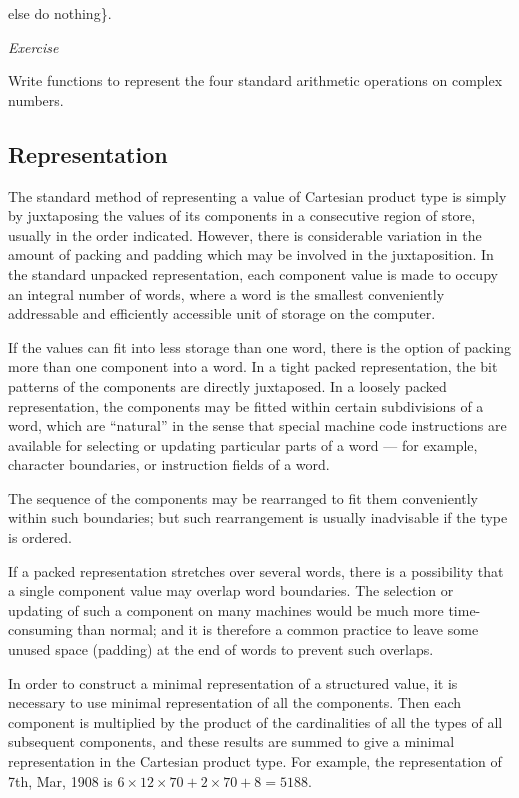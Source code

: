 \quad \quad \quad else do nothing\}.

\noindent
\textit{Exercise}
\nopagebreak

\noindent
Write functions to represent the four standard arithmetic operations on complex numbers.

\subsection{Representation}

The standard method of representing a value of Cartesian product type is simply by juxtaposing the values of its components in a consecutive region of store, usually in the order indicated. However, there is considerable variation in the amount of packing and padding which may be involved in the juxtaposition. In the standard unpacked representation, each component value is made to occupy an integral number of words, where a word is the smallest conveniently addressable and efficiently accessible unit of storage on the computer.

If the values can fit into less storage than one word, there is the option of packing more than one component into a word. In a tight packed representation, the bit patterns of the components are directly juxtaposed. In a loosely packed representation, the components may be fitted within certain subdivisions of a word, which are ``natural'' in the sense that special machine code instructions are available for selecting or updating particular parts of a word --- for example, character boundaries, or instruction fields of a word.

The sequence of the components may be rearranged to fit them conveniently within such boundaries; but such rearrangement is usually inadvisable if the type is ordered.

If a packed representation stretches over several words, there is a possibility that a single component value may overlap word boundaries. The selection or updating of such a component on many machines would be much more time-consuming than normal; and it is therefore a common practice to leave some unused space (padding) at the end of words to prevent such overlaps.

In order to construct a minimal representation of a structured value, it is necessary to use minimal representation of all the components. Then each component is multiplied by the product of the cardinalities of all the types of all subsequent components, and these results are summed to give a minimal representation in the Cartesian product type. For example, the representation of 7th, Mar, 1908 is $6\times 12\times 70 + 2\times 70 + 8 = 5188$.


